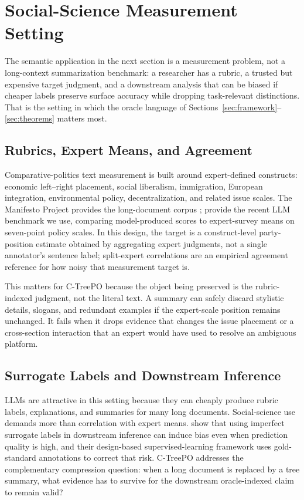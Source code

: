 \section{Social-Science Measurement Setting}\label{sec:social-measurement}

The semantic application in the next section is a measurement problem,
not a long-context summarization benchmark: a researcher has a
rubric, a trusted but expensive target judgment, and a downstream analysis
that can be biased if cheaper labels preserve surface accuracy while
dropping task-relevant distinctions. That is the setting in which the
oracle language of Sections~\ref{sec:framework}--\ref{sec:theorems}
matters most.

\subsection{Rubrics, Expert Means, and Agreement}

Comparative-politics text measurement is built around expert-defined
constructs: economic left--right placement, social liberalism, immigration,
European integration, environmental policy, decentralization, and related
issue scales. The Manifesto Project provides the long-document corpus
\citep{ManifestoProject2025a}; \citet{BenoitEtAl2025} provide the recent
LLM benchmark we use, comparing model-produced scores to expert-survey
means on seven-point policy scales. In this design, the target is a
construct-level party-position estimate obtained by aggregating expert
judgments, not a single annotator's sentence label; split-expert
correlations are an empirical agreement reference for how noisy that
measurement target is.

This matters for C-TreePO because the object being preserved is the
rubric-indexed judgment, not the literal text. A summary can safely discard
stylistic details, slogans, and redundant examples if the expert-scale
position remains unchanged. It fails when it drops evidence that changes
the issue placement or a cross-section interaction that an expert would
have used to resolve an ambiguous platform.

\subsection{Surrogate Labels and Downstream Inference}

LLMs are attractive in this setting because they can cheaply produce
rubric labels, explanations, and summaries for many long documents.
Social-science use demands more than correlation with expert means.
\citet{EgamiEtAl2024} show that using imperfect surrogate
labels in downstream inference can induce bias even when prediction
quality is high, and their design-based supervised-learning framework
uses gold-standard annotations to correct that risk. C-TreePO addresses
the complementary compression question: when a long document is replaced
by a tree summary, what evidence has to survive for the downstream
oracle-indexed claim to remain valid?


